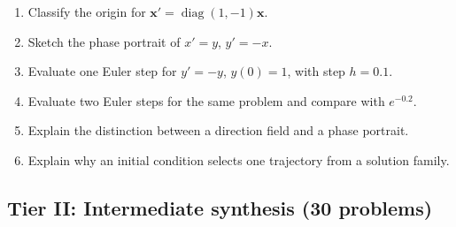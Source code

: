 \begin{enumerate}[label=\textbf{\arabic*.},leftmargin=*]
\item Classify the origin for $\mathbf x'=\operatorname{diag}(1,-1)\mathbf x$.
\item Sketch the phase portrait of $x'=y$, $y'=-x$.
\item Evaluate one Euler step for $y'=-y$, $y(0)=1$, with step $h=0.1$.
\item Evaluate two Euler steps for the same problem and compare with $e^{-0.2}$.
\item Explain the distinction between a direction field and a phase portrait.
\item Explain why an initial condition selects one trajectory from a solution family.
\end{enumerate}

\subsection*{Tier II: Intermediate synthesis (30 problems)}
